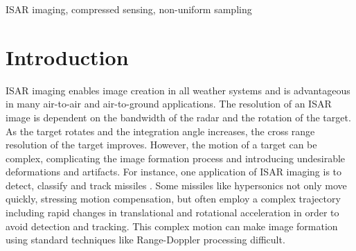 \documentclass[conference]{IEEEtran}
\begin{document}
\begin{abstract}
Inverse Synthetic Aperture Radar (ISAR) imaging can form high resolution images of non-cooperative targets, but complex motion with higher-order motion terms can hinder standard image formation techniques. The Matching Fourier Transform is a popular method to form images of non-uniformly rotating targets as it compensates for the non-linear phase by incorporating the estimated motion parameters into the phase model \cite{Zuo_2020}. However, this method does not directly address non-uniform sampling. In order to produce high resolution images of targets with challenging motion, we propose that it may be beneficial to separate and optimize each individual image processing step, including non-uniform sampling correction, to improve overall performance. Compressed sensing enables image formation with sub-Nyquist sampling and has demonstrated an ability to reconstruct uniquely challenging images. This article formulates backprojection as an explicit linear system, demonstrates the effects of angular sampling density weighting compensating for non-uniform sampling and proposes a method using compressed sensing techniques for correcting non-uniform sampling and forming an image with super-resolution.
\end{abstract}

\begin{IEEEkeywords}
ISAR imaging, compressed sensing, non-uniform sampling
\end{IEEEkeywords}

\section{Introduction} \label{sec:intro}

ISAR imaging enables image creation in all weather systems and is advantageous in many air-to-air and air-to-ground applications. The resolution of an ISAR image is dependent on the bandwidth of the radar and the rotation of the target. As the target rotates and the integration angle increases, the cross range resolution of the target improves. However, the motion of a target can be complex, complicating the image formation process and introducing undesirable deformations and artifacts. For instance, one application of ISAR imaging is to detect, classify and track missiles \cite{Liu_2012}. Some missiles like hypersonics not only move quickly, stressing motion compensation, but often employ a complex trajectory including rapid changes in translational and rotational acceleration in order to avoid detection and tracking. This complex motion can make image formation using standard techniques like Range-Doppler processing difficult. 
\end{document}
